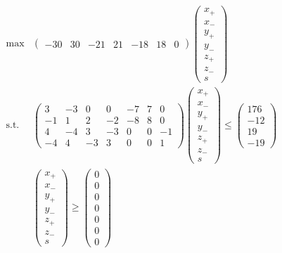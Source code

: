 \documentclass[12pt]{article}
\begin{document}
\[
\begin{array}{lll}
\text{max} & \begin{pmatrix} -30 & 30 & -21 & 21 & -18 & 18 & 0 \end{pmatrix} \begin{pmatrix} x_+ \\ x_- \\ y_+ \\ y_- \\ z_+ \\ z_- \\ s \end{pmatrix} & \\
\text{s.t.} & \begin{pmatrix}
3 & -3 & 0 & 0 & -7 & 7 & 0 \\
-1 & 1 & 2 & -2 & -8 & 8 & 0 \\
4 & -4 & 3 & -3 & 0 & 0 & -1 \\
-4 & 4 & -3 & 3 & 0 & 0 & 1
\end{pmatrix} \begin{pmatrix} x_+ \\ x_- \\ y_+ \\ y_- \\ z_+ \\ z_- \\ s \end{pmatrix} \leq \begin{pmatrix} 176 \\ -12 \\ 19 \\ -19 \end{pmatrix} & \\
& \begin{pmatrix} x_+ \\ x_- \\ y_+ \\ y_- \\ z_+ \\ z_- \\ s \end{pmatrix} \geq \begin{pmatrix} 0 \\ 0 \\ 0 \\ 0 \\ 0 \\ 0 \\ 0 \end{pmatrix} &
\end{array}
\]
\end{document}
